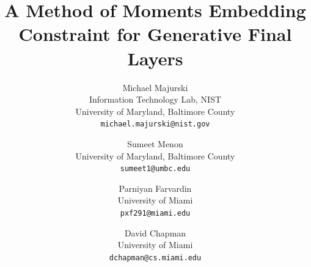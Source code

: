 \documentclass[10pt,twocolumn,letterpaper]{article}
\begin{document}
	
	\title{A Method of Moments Embedding Constraint for Generative Final Layers}
	
	\author{Michael Majurski\\
		Information Technology Lab, NIST\\
		University of Maryland, Baltimore County\\
		{\tt\small michael.majurski@nist.gov}
	\and
	Sumeet Menon\\
	University of Maryland, Baltimore County\\
	{\tt\small sumeet1@umbc.edu}
	\and
	Parniyan Farvardin\\
	University of Miami\\
	{\tt\small pxf291@miami.edu}
	\and
	David Chapman\\
	University of Miami\\
	{\tt\small dchapman@cs.miami.edu}
}

\maketitle





\end{document}
